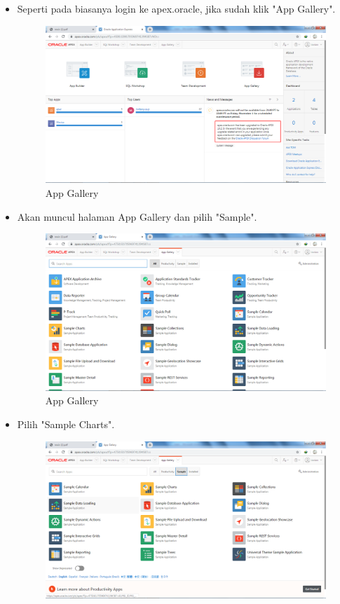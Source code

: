 \documentclass[12pt, times new roman]{article}
\begin{document}
\begin{itemize}
\item Seperti pada biasanya login ke apex.oracle, jika sudah klik "App Gallery".
\begin{figure}[!htpb]
	\centering
	\includegraphics[width=12cm]{figures/Screenshot_24.png}
	\caption{App Gallery}
\end{figure}
\item Akan muncul halaman App Gallery dan pilih "Sample".
\begin{figure}[!htpb]
	\centering
	\includegraphics[width=12cm]{figures/Screenshot_25.png}
	\caption{App Gallery}
\end{figure}
\item Pilih "Sample Charts".
\begin{figure}[!htpb]
	\centering
	\includegraphics[width=12.5cm]{figures/Screenshot_26.png}

\end{figure}
\end{itemize}
\end{document}

